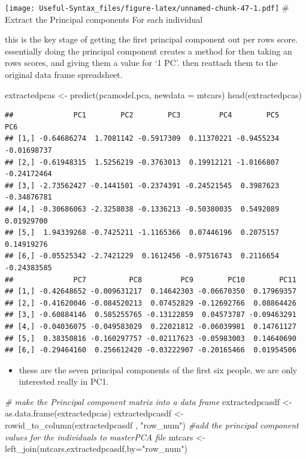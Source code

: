 \documentclass[
]{article}
\newenvironment{Shaded}{\begin{snugshade}}{\end{snugshade}}
\newcommand{\AttributeTok}[1]{\textcolor[rgb]{0.77,0.63,0.00}{#1}}
\newcommand{\CommentTok}[1]{\textcolor[rgb]{0.56,0.35,0.01}{\textit{#1}}}
\newcommand{\FunctionTok}[1]{\textcolor[rgb]{0.00,0.00,0.00}{#1}}
\newcommand{\NormalTok}[1]{#1}
\newcommand{\OtherTok}[1]{\textcolor[rgb]{0.56,0.35,0.01}{#1}}
\newcommand{\StringTok}[1]{\textcolor[rgb]{0.31,0.60,0.02}{#1}}
\providecommand{\tightlist}{%
  \setlength{\itemsep}{0pt}\setlength{\parskip}{0pt}}
\begin{document}
\texttt{[image: Useful-Syntax\_files/figure-latex/unnamed-chunk-47-1.pdf]}
\# Extract the Principal components For each individual

this is the key stage of getting the first principal component out per rows score. essentially doing the principal component creates a method for then taking an rows scores, and giving them a value for `1 PC'. then reattach them to the original data frame spreadsheet.

\begin{Shaded}
\begin{Highlighting}[]
\NormalTok{extractedpcas }\OtherTok{\textless{}{-}} \FunctionTok{predict}\NormalTok{(pcamodel.pca, }\AttributeTok{newdata =}\NormalTok{ mtcars)}
\FunctionTok{head}\NormalTok{(extractedpcas)}
\end{Highlighting}
\end{Shaded}

\begin{verbatim}
##              PC1        PC2        PC3         PC4        PC5         PC6
## [1,] -0.64686274  1.7081142 -0.5917309  0.11370221 -0.9455234 -0.01698737
## [2,] -0.61948315  1.5256219 -0.3763013  0.19912121 -1.0166807 -0.24172464
## [3,] -2.73562427 -0.1441501 -0.2374391 -0.24521545  0.3987623 -0.34876781
## [4,] -0.30686063 -2.3258038 -0.1336213 -0.50380035  0.5492089  0.01929700
## [5,]  1.94339268 -0.7425211 -1.1165366  0.07446196  0.2075157  0.14919276
## [6,] -0.05525342 -2.7421229  0.1612456 -0.97516743  0.2116654 -0.24383585
##              PC7          PC8         PC9        PC10        PC11
## [1,] -0.42648652 -0.009631217  0.14642303 -0.06670350  0.17969357
## [2,] -0.41620046 -0.084520213  0.07452829 -0.12692766  0.08864426
## [3,] -0.60884146  0.585255765 -0.13122859  0.04573787 -0.09463291
## [4,] -0.04036075 -0.049583029  0.22021812 -0.06039981  0.14761127
## [5,]  0.38350816 -0.160297757 -0.02117623 -0.05983003  0.14640690
## [6,] -0.29464160  0.256612420 -0.03222907 -0.20165466  0.01954506
\end{verbatim}

\begin{itemize}
\tightlist
\item
  these are the seven principal components of the first six people. we are only interested really in PC1.
\end{itemize}

\begin{Shaded}
\begin{Highlighting}[]
\CommentTok{\# make the Principal component matrix into a data frame }
\NormalTok{extractedpcasdf }\OtherTok{\textless{}{-}} \FunctionTok{as.data.frame}\NormalTok{(extractedpcas)}
\NormalTok{extractedpcasdf }\OtherTok{\textless{}{-}} \FunctionTok{rowid\_to\_column}\NormalTok{(extractedpcasdf , }\StringTok{"row\_num"}\NormalTok{)}
\CommentTok{\#add the principal component values for the individuals to masterPCA file}
\NormalTok{mtcars }\OtherTok{\textless{}{-}} \FunctionTok{left\_join}\NormalTok{(mtcars,extractedpcasdf,}\AttributeTok{by=}\StringTok{"row\_num"}\NormalTok{)}
\end{Highlighting}
\end{Shaded}
\end{document}
